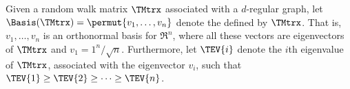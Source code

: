 \begin{defn}
    Given a random walk matrix $\TMtrx$ associated with a $d$-regular
    graph, let $\Basis(\TMtrx)= \permut{v_1,\ldots, v_n}$ denote the
     defined by $\TMtrx$. That
    is, $v_1,\ldots, v_n$ is an orthonormal basis for $\Re^n$, where
    all these vectors are eigenvectors of $\TMtrx$ and $v_1=
    1^n/\sqrt{n}$. Furthermore, let $\TEV{i}$ denote the $i$th
    eigenvalue of $\TMtrx$, associated with the eigenvector $v_i$,
    such that $\TEV{1} \geq \TEV{2} \geq \cdots \geq \TEV{n}$.

\end{defn}
